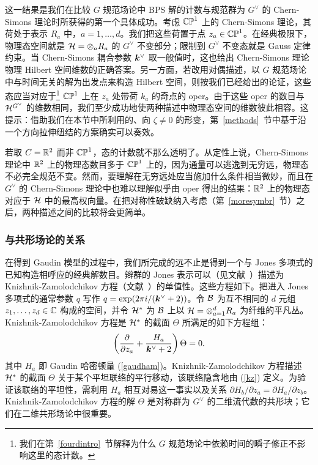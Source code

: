这一结果是我们在比较 $G$ 规范场论中 BPS 解的计数与规范群为 $G^\vee$ 的 Chern-Simons 理论时所获得的第一个具体成功。考虑 $\Bbb{CP}^1$ 上的 Chern-Simons 理论，其荷处于表示 $R_a$ 中，$a=1,\dots,d$。我们把这些荷置于点 $z_a\in \Bbb{CP}^1$。在经典极限下，物理态空间就是 $\H=\otimes_a R_a$ 的 $G^\vee$ 不变部分；限制到 $G^\vee$ 不变态就是 Gauss 定律约束。当 Chern-Simons 耦合参数 $\k^\vee$ 取一般值时，这也给出 Chern-Simons 理论物理 Hilbert 空间维数的正确答案。另一方面，若改用对偶描述，以 $G$ 规范场论中与时间无关的解为出发点来构造 Hilbert 空间，则按我们已经给出的论证，这些态应当对应于\footnote{我们在第~\ref{fourdintro}~节解释为什么 $G$ 规范场论中依赖时间的瞬子修正不影响这里的态计数。} $\Bbb{CP}^1$ 上在 $z_a$ 处带荷 $k_a$ 的奇点的 oper。由于这些 oper 的数目与 $\H^{G^\vee}$ 的维数相同，我们至少成功地使两种描述中物理态空间的维数彼此相容。这提示：借助我们在本节中所利用的、向 $\zeta\not=0$ 的形变，第~\ref{methods}~节中基于沿一个方向拉伸纽结的方案确实可以奏效。

若取 $C=\R^2$ 而非 $\CP^1$，态的计数就不那么透明了。从定性上说，Chern-Simons 理论中 $\R^2$ 上的物理态数目多于 $\CP^1$ 上的，因为通量可以逃逸到无穷远，物理态不必完全规范不变。然而，要理解在无穷远处应当施加什么条件相当微妙，而且在 $G^\vee$ 的 Chern-Simons 理论中也难以理解似乎由 oper 得出的结果：$\R^2$ 上的物理态对应于 $\H$ 中的最高权向量。在把对称性破缺纳入考虑（第~\ref{moresymbr}~节）之后，两种描述之间的比较将会更简单。


\subsubsection{与共形场论的关系}\label{relconf}



在得到 Gaudin 模型的过程中，我们所完成的远不止是得到一个与 Jones 多项式的已知构造相呼应的经典解数目。辫群的 Jones 表示可以（见文献~\cite{TK}）描述为 Knizhnik-Zamolodchikov 方程（文献~\cite{KZ}）的单值性。这些方程如下。把进入 Jones 多项式的通常参数 $q$ 写作 $q=\exp(2\pi i/(\k^\vee+2))$。令 $\eusm B$ 为互不相同的 $d$ 元组 $z_1,\dots,z_d\in\C$ 构成的空间，并令 $\H^*$ 为 $\eusm B$ 上以 $\H=\otimes_{a=1}^d R_a$ 为纤维的平凡丛。Knizhnik-Zamolodchikov 方程是 $\H^*$ 的截面 $\Theta$ 所满足的如下方程组：
\begin{equation}\label{kz}\left(\frac{\partial}{\partial z_a}+\frac{H_a}{\k^\vee+2}\right)\Theta=0.
\end{equation}
其中 $H_a$ 即 Gaudin 哈密顿量 (\ref{gaudham})。Knizhnik-Zamolodchikov 方程描述 $\H^*$ 的截面 $\Theta$ 关于某个平坦联络的平行移动，该联络隐含地由 (\ref{kz}) 定义。为验证该联络的平坦性，需利用 $H_a$ 相互对易这一事实以及关系 $\partial H_b/\partial z_a=\partial H_a/\partial z_b$。Knizhnik-Zamolodchikov 方程的解 $\Theta$ 是对称群为 $G^\vee$ 的二维流代数的共形块；它们在二维共形场论中很重要。

